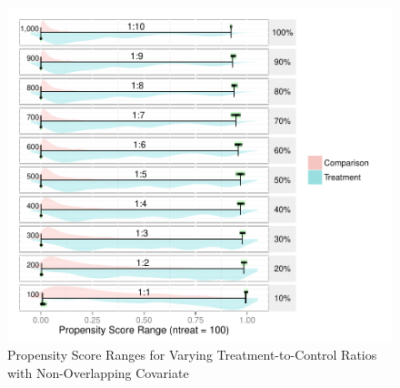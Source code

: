 \begin{singlespace}
\begin{figure}[h!]
\begin{center}
\includegraphics[width=\textwidth]{../Figures2009/PSRanges-NoOverlap.pdf}
\caption{Propensity Score Ranges for Varying Treatment-to-Control Ratios with Non-Overlapping Covariate}
\end{center}
\end{figure}

\end{singlespace}



